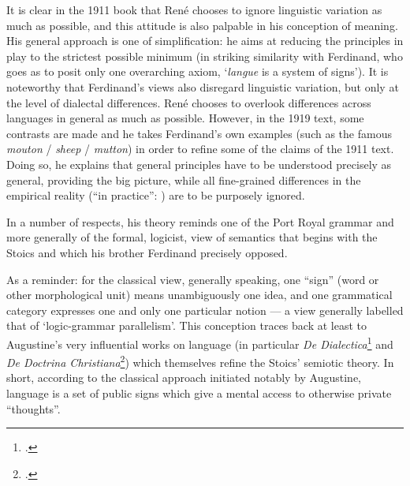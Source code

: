 \documentclass[output=paper]{langsci/langscibook}
\begin{document}
It is clear in the 1911 book that René chooses to ignore linguistic
variation as much as possible, and this attitude is also palpable in
his conception of meaning. His general approach is one of
simplification: he aims at reducing the principles in play to the
strictest possible minimum (in striking similarity with Ferdinand, who
goes as to posit only one overarching axiom, ‘\emph{langue} is a
system of signs’). It is noteworthy that Ferdinand’s views also
disregard linguistic variation, but only at the level of dialectal
differences. René chooses to overlook differences across languages in
general as much as possible. However, in the 1919 text, some contrasts
are made and he takes Ferdinand’s own examples (such as the famous
\emph{mouton} / \emph{sheep} / \emph{mutton}) in order to refine some
of the claims of the 1911 text. Doing so, he explains that general
principles have to be understood precisely as general, providing the
big picture, while all fine-grained differences in the empirical
reality (“in practice”:
\citealt[15]{r.desaussure19:structure.logique}) are to be purposely
ignored.

In a number of respects, his theory reminds one of the Port Royal
grammar \citep{arnauld-lancelot1660:port-royal} and more generally of
the formal, logicist, view of semantics that begins with the Stoics
and which his brother Ferdinand precisely opposed.

As a reminder: for the classical view, generally speaking, one ``sign''
(word or other morphological unit) means unambiguously one idea, and
one grammatical category expresses one and only one particular notion
--- a view generally labelled that of ‘logic-grammar
parallelism’. This conception traces back at least to Augustine’s very
influential works on language (in particular \textsl{De
  Dialectica}\footnote{\protect\citealt{augustine:de-dialectica}.} and
\textsl{De Doctrina
  Christiana}\footnote{\protect\citealt{augustine:de-doctrina-christiana}.})
which themselves refine the Stoics' semiotic theory. In short,
according to the classical approach initiated notably by Augustine,
language is a set of public signs which give a mental access to
otherwise private ``thoughts''.
\end{document}
